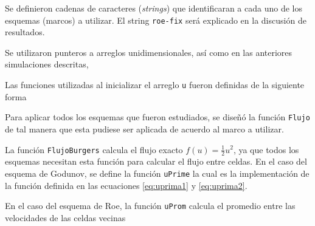 \documentclass[12pt]{article}
\begin{document}
	
	
	Se definieron cadenas de caracteres (\textit{strings}) que identificaran a cada uno de los esquemas (marcos) a utilizar. El string \texttt{roe-fix} será explicado en la discusión de resultados.
	
	
	Se utilizaron punteros a arreglos unidimensionales, así como en las anteriores simulaciones descritas,
	
	
	
	
	
	Las funciones utilizadas al inicializar el arreglo \texttt{u} fueron definidas de la siguiente forma
	
	
	
	Para aplicar todos los esquemas que fueron estudiados, se diseñó la función \texttt{Flujo} de tal manera que esta pudiese ser aplicada de acuerdo al marco a utilizar.
 	
 	
 	
 	La función \texttt{FlujoBurgers} calcula el flujo exacto $f(u) = \frac{1}{2}u^{2}$, ya que todos los esquemas necesitan esta función para calcular el flujo entre celdas. En el caso del esquema de Godunov, se define la función \texttt{uPrime} la cual es la implementación de la función definida en las ecuaciones \ref{eq:uprima1} y \ref{eq:uprima2}.
 	
 	
 	
 	En el caso del esquema de Roe, la función \texttt{uProm} calcula el promedio entre las velocidades de las celdas vecinas
 	
\end{document}

